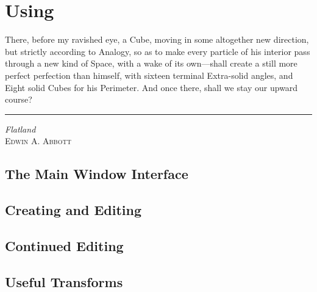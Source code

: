 \chapter{Using \dtypkghdr{}}
\label{chap:using_epspline}

\ifMKwx
	\small
	There, before my ravished eye, a Cube, moving in some
	altogether new direction, but strictly according to
	Analogy, so as to make every particle of his interior
	pass through a new kind of Space, with a wake of
	its own---shall create a still more perfect
	perfection than himself, with sixteen terminal
	Extra-solid angles, and Eight solid Cubes for his
	Perimeter. And once there, shall we stay
	our upward course?\\
	\hrule%
	\textit{Flatland}\\ \textsc{Edwin A. Abbott}
	\normalsize
\else
\fi %


	\section{The Main Window Interface}%
	\label{sec:window_interface}
	

	\section{Creating and Editing}%
	\label{sec:creat_editing}
	

	\section{Continued Editing}%
	\label{sec:cont_editing}
	

	\section{Useful Transforms}%
	\label{sec:useful_transforms}
	

